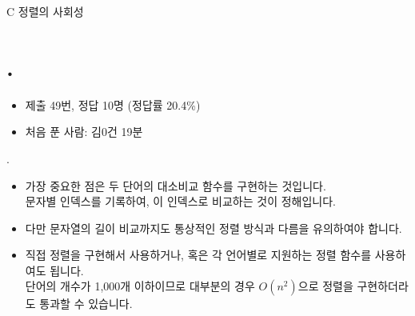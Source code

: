 
\setproblem
    {C}
    {정렬의 사회성}

\section{\pletter. \ptitle}

\begin{frame}[label=problem-C] %
    \sectiontitle{\pletter}{\ptitle}
    \begin{itemize}
        \item 제출 49번, 정답 10명 (정답률 20.4\%)
        \item 처음 푼 사람: 김0건 19분
    \end{itemize}
\end{frame}
\begin{frame}{\textbf{\pletter}. \ptitle}
    \begin{itemize}
        \item 가장 중요한 점은 두 단어의 대소비교 함수를 구현하는 것입니다.\\
        문자별 인덱스를 기록하여, 이 인덱스로 비교하는 것이 정해입니다.

        \item 다만 문자열의 길이 비교까지도 통상적인 정렬 방식과 다름을 유의하여야 합니다.

        \item 직접 정렬을 구현해서 사용하거나, 혹은 각 언어별로 지원하는 정렬 함수를 사용하여도 됩니다.\\
        단어의 개수가 1,000개 이하이므로 대부분의 경우 $O(n^2)$으로 정렬을 구현하더라도 통과할 수 있습니다.
    \end{itemize}
\end{frame}
